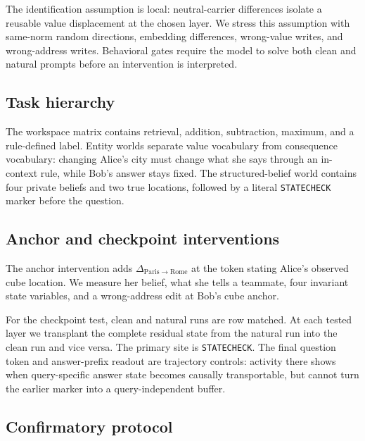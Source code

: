 \documentclass[10pt]{article}
\begin{document}
The identification assumption is local: neutral-carrier differences isolate a
reusable value displacement at the chosen layer. We stress this assumption with
same-norm random directions, embedding differences, wrong-value writes, and
wrong-address writes. Behavioral gates require the model to solve both clean
and natural prompts before an intervention is interpreted.

\subsection{Task hierarchy}

The workspace matrix contains retrieval, addition, subtraction, maximum, and a
rule-defined label. Entity worlds separate value vocabulary from consequence
vocabulary: changing Alice's city must change what she says through an
in-context rule, while Bob's answer stays fixed. The structured-belief world
contains four private beliefs and two true locations, followed by a literal
\texttt{STATECHECK} marker before the question.

\subsection{Anchor and checkpoint interventions}

The anchor intervention adds $\Delta_{\mathrm{Paris}\rightarrow\mathrm{Rome}}$
at the token stating Alice's observed cube location. We measure her belief,
what she tells a teammate, four invariant state variables, and a wrong-address
edit at Bob's cube anchor.

For the checkpoint test, clean and natural runs are row matched. At each tested
layer we transplant the complete residual state from the natural run into the
clean run and vice versa. The primary site is \texttt{STATECHECK}. The final
question token and answer-prefix readout are trajectory controls: activity
there shows when query-specific answer state becomes causally transportable,
but cannot turn the earlier marker into a query-independent buffer.

\subsection{Confirmatory protocol}
\end{document}
